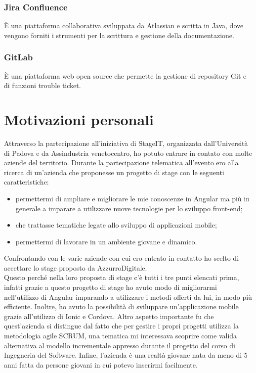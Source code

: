 \subsubsection{Jira Confluence}
È una piattaforma collaborativa sviluppata da Atlassian e scritta in Java, dove vengono forniti i strumenti per la scrittura e gestione della documentazione.

\subsubsection{GitLab}
È una piattaforma web open source che permette la gestione di repository Git e di funzioni trouble ticket.

\section{Motivazioni personali}
Attraverso la partecipazione all'iniziativa di StageIT, organizzata dall'Università di Padova e da Assindustria venetocentro, ho potuto entrare in contato con molte aziende del territorio.
Durante la partecipazione telematica all'evento ero alla ricerca di un’azienda che proponesse un progetto di stage con le seguenti caratteristiche:

\begin{itemize}
	\item permettermi di ampliare e migliorare le mie conoscenze in Angular ma più in generale a imparare a utilizzare nuove tecnologie per lo sviluppo front-end;
	\item che trattasse tematiche legate allo sviluppo di applicazioni mobile;
	\item permettermi di lavorare in un ambiente giovane e dinamico.
	
\end{itemize}  

Confrontando con le varie aziende con cui ero entrato in contatto ho scelto di accettare lo stage proposto da AzzurroDigitale. \\
Questo perché nella loro proposta di stage c'è tutti i tre punti elencati prima, infatti grazie a questo progetto di stage ho avuto modo di migliorarmi nell’utilizzo di Angular imparando a utilizzare i metodi offerti da lui, in modo più efficiente. Inoltre, ho avuto la possibilità di sviluppare un’applicazione mobile grazie all'utilizzo di Ionic e Cordova. Altro aspetto importante fu che quest'azienda si distingue dal fatto che per gestire i propri progetti utilizza la metodologia agile \gls{SCRUM}, una tematica mi interessava scoprire come valida alternativa al modello incrementale appresso durante il progetto del corso di Ingegneria del Software. Infine, l'azienda è una realtà giovane nata da meno di 5 anni fatta da persone giovani in cui potevo inserirmi facilmente.\\
